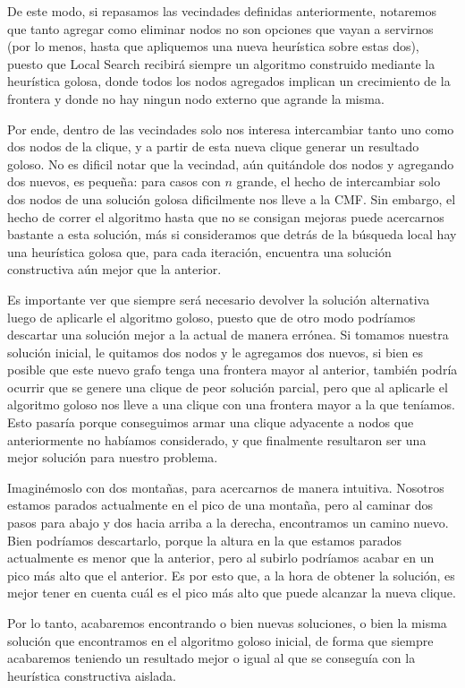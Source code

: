 De este modo, si repasamos las vecindades definidas anteriormente, notaremos que tanto agregar como eliminar nodos no son opciones que vayan a servirnos (por lo menos, hasta que apliquemos una nueva heurística sobre estas dos), puesto que Local Search recibirá siempre un algoritmo construido mediante la heurística golosa, donde todos los nodos agregados implican un crecimiento de la frontera y donde no hay ningun nodo externo que agrande la misma.

Por ende, dentro de las vecindades solo nos interesa intercambiar tanto uno como dos nodos de la clique, y a partir de esta nueva clique generar un resultado goloso. No es dificil notar que la vecindad, aún quitándole dos nodos y agregando dos nuevos, es pequeña: para casos con $n$ grande, el hecho de intercambiar solo dos nodos de una solución golosa dificilmente nos lleve a la CMF. Sin embargo, el hecho de correr el algoritmo hasta que no se consigan mejoras puede acercarnos bastante a esta solución, más si consideramos que detrás de la búsqueda local hay una heurística golosa que, para cada iteración, encuentra una solución constructiva aún mejor que la anterior.

Es importante ver que siempre será necesario devolver la solución alternativa luego de aplicarle el algoritmo goloso, puesto que de otro modo podríamos descartar una solución mejor a la actual de manera errónea. Si tomamos nuestra solución inicial, le quitamos dos nodos y le agregamos dos nuevos, si bien es posible que este nuevo grafo tenga una frontera mayor al anterior, también podría ocurrir que se genere una clique de peor solución parcial, pero que al aplicarle el algoritmo goloso nos lleve a una clique con una frontera mayor a la que teníamos. Esto pasaría porque conseguimos armar una clique adyacente a nodos que anteriormente no habíamos considerado, y que finalmente resultaron ser una mejor solución para nuestro problema.

Imaginémoslo con dos montañas, para acercarnos de manera intuitiva. Nosotros estamos parados actualmente en el pico de una montaña, pero al caminar dos pasos para abajo y dos hacia arriba a la derecha, encontramos un camino nuevo. Bien podríamos descartarlo, porque la altura en la que estamos parados actualmente es menor que la anterior, pero al subirlo podríamos acabar en un pico más alto que el anterior. Es por esto que, a la hora de obtener la solución, es mejor tener en cuenta cuál es el pico más alto que puede alcanzar la nueva clique.

Por lo tanto, acabaremos encontrando o bien nuevas soluciones, o bien la misma solución que encontramos en el algoritmo goloso inicial, de forma que siempre acabaremos teniendo un resultado mejor o igual al que se conseguía con la heurística constructiva aislada.

